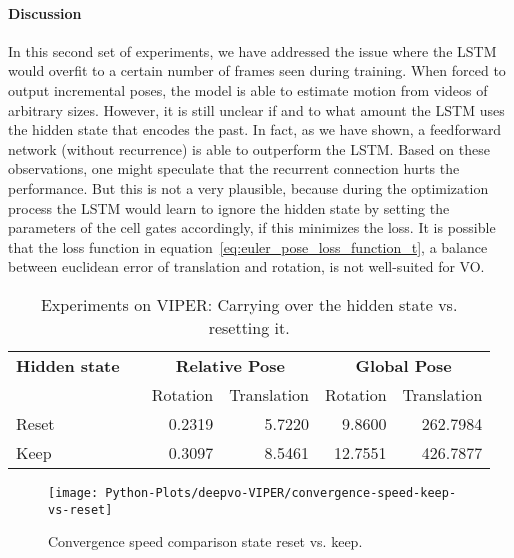 		\paragraph{Discussion}
		In this second set of experiments, we have addressed the issue where the LSTM would overfit to a certain number of frames seen during training.
		When forced to output incremental poses, the model is able to estimate motion from videos of arbitrary sizes.
		However, it is still unclear if and to what amount the LSTM uses the hidden state that encodes the past.
		In fact, as we have shown, a feedforward network (without recurrence) is able to outperform the LSTM.
		Based on these observations, one might speculate that the recurrent connection hurts the performance.
		But this is not a very plausible, because during the optimization process the LSTM would learn to ignore the hidden state by setting the parameters of the cell gates accordingly, if this minimizes the loss.
		It is possible that the loss function in equation~\ref{eq:euler_pose_loss_function_t}, a balance between euclidean error of translation and rotation, is not well-suited for VO.
		\begin{table}[tb]
			\small
			\begin{center}
				\begin{tabular}{lcrrrr}
					\toprule
					\textbf{Hidden state} & & \multicolumn{2}{c}{\textbf{Relative Pose}} & \multicolumn{2}{c}{\textbf{Global Pose}} \\
					& & Rotation & Translation & Rotation & Translation \\
					\midrule
					Reset 		& 			& 0.2319	& 5.7220	& 9.8600	& 262.7984		\\ 
					Keep		&			& 0.3097	& 8.5461	& 12.7551	& 426.7877		\\
					\bottomrule
				\end{tabular}
			\end{center}
			\caption[Experiments on VIPER: Carrying over the hidden state vs. resetting it]
					{Experiments on VIPER: Carrying over the hidden state vs. resetting it.
					 \label{tbl:kitti-removing-lstm}}
		\end{table}
	
		\begin{figure}[t]
			\centering
			\texttt{[image: Python-Plots/deepvo-VIPER/convergence-speed-keep-vs-reset]}
			\caption[]
					{Convergence speed comparison state reset vs. keep.}
		\end{figure}
		
